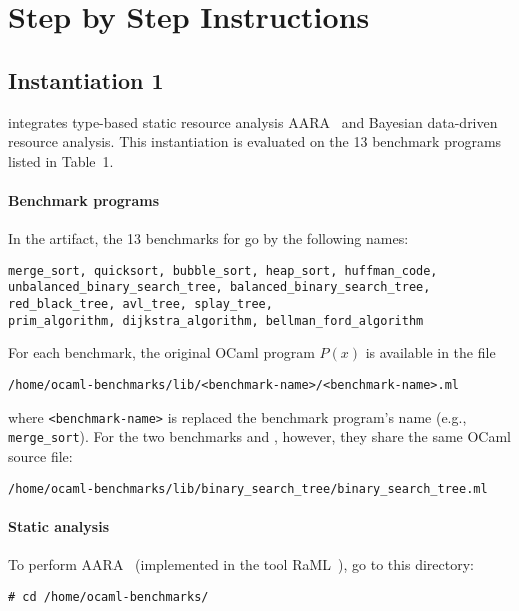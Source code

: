 
\section{Step by Step Instructions}
\label{sec:step-by-step-instructions}

\subsection{Instantiation 1}
\label{sec:step-by-step-instructions:instantiation-1}

 integrates type-based static resource
analysis AARA~\citep{Hoffmann2011a,Hoffmann2017} and Bayesian data-driven
resource analysis.
%
This instantiation is evaluated on the 13 benchmark programs listed in Table~1.

\paragraph{Benchmark programs}

In the artifact, the 13 benchmarks for 
go by the following names:
\begin{verbatim}
merge_sort, quicksort, bubble_sort, heap_sort, huffman_code,
unbalanced_binary_search_tree, balanced_binary_search_tree,
red_black_tree, avl_tree, splay_tree,
prim_algorithm, dijkstra_algorithm, bellman_ford_algorithm
\end{verbatim}
%
For each benchmark, the original OCaml program $P(x)$ is available in the file
\begin{verbatim}
/home/ocaml-benchmarks/lib/<benchmark-name>/<benchmark-name>.ml
\end{verbatim}
where \texttt{<benchmark-name>} is replaced the benchmark program's name (e.g.,
\texttt{merge\_sort}).
%
For the two benchmarks \unbalancedbst{} and \balancedbst{}, however, they share
the same OCaml source file:
\begin{verbatim}
/home/ocaml-benchmarks/lib/binary_search_tree/binary_search_tree.ml
\end{verbatim}

\paragraph{Static analysis}

To perform AARA~\citep{Hoffmann2011a,Hoffmann2017} (implemented in the tool
RaML~\citep{RaML}), go to this directory:
\begin{verbatim}
# cd /home/ocaml-benchmarks/
\end{verbatim}

